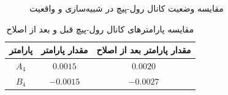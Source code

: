\begin{figure}[H]
	\centering
	\caption{مقايسه وضعیت کانال رول-پیچ در شبیه‌سازی و واقعیت}
\end{figure}

\vspace{1.5cm}
\begin{table}[H]
	\begin{center}
		\begin{tabular}{ccc}\hline
	پارامتر & مقدار پارامتر  & مقدار پارامتر بعد از اصلاح
	\\ \hline
	$A_4$  & $0.0015$ & $0.0020$ \\
	$B_4$  & $-0.0015$ & $-0.0027$ \\ \hline
\end{tabular}
	\end{center}
\caption {مقايسه پارامترهای کانال رول-پیچ قبل و بعد از اصلاح}
\end{table}


